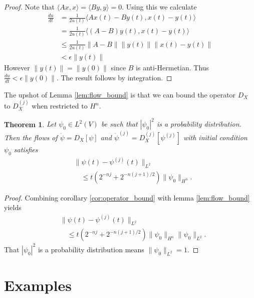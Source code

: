 \documentclass[letterpaper, 10 pt, conference]{ieeeconf}
\newtheorem{thm}{Theorem}[section]
\begin{document}
  \begin{proof}
    Note that $\langle Ax,x\rangle = \langle By,y \rangle = 0$.
    Using this we calculate
    \begin{align*}
      \frac{du}{dt} &= \frac{1}{2u(t)} \langle
      Ax(t) - By(t) , x(t) - y(t) \rangle \\
      &= \frac{1}{2u(t)} \langle
      (A-B)y(t) , x(t) - y(t) \rangle \\
      &\leq \frac{1}{2u(t)} \| A-B\|  \|y(t)\|  \|x(t) - y(t) \| \\
      &< \epsilon \|y(t) \|
    \end{align*}
    However $\| y(t) \| = \| y(0) \|$ since $B$ is anti-Hermetian.
    Thus $\frac{du}{dt} < \epsilon \| y(0) \|$.
    The result follows by integration.
  \end{proof}
  The upshot of Lemma \ref{lem:flow_bound} is that we can bound the
  operator $D_X$ to $D_X^{(j)}$ when restricted to $H^n$.
  \begin{thm}\label{thm:convergence}
    Let $\psi_0 \in L^2(V)$ be such that $|\psi_0|^2$ is a probability distribution.
    Then the flows of $\dot{\psi} = D_X[\psi]$ and $\dot{\psi}^{(j)} = D_X^{(j)}[\psi^{(j)}]$ with initial condition $\psi_0$
    satisfies
    \begin{align*}
      &\| \psi(t) - \psi^{(j)}(t) \|_{L^2}  \\
      &\quad\leq t( 2^{-nj} + 2^{-n(j+1)/2}) \| \psi_0\|_{H^n} .
    \end{align*}
  \end{thm}
  \begin{proof}
    Combining corollary \ref{cor:operator_bound} with lemma \ref{lem:flow_bound}
    yields
    \begin{align*}
      &\| \psi(t) - \psi^{(j)}(t) \|_{L^2}  \\
      &\quad\leq t( 2^{-nj} + 2^{-n(j+1)/2}) \| \psi_0 \|_{H^n} \| \psi_0 \|_{L^2}.
    \end{align*}
    That $|\psi_0|^2$ is a probability distribution means $\| \psi_0\|_{L^2} = 1$.
  \end{proof}


\section{Examples}
\label{sec:Examples}
\end{document}
